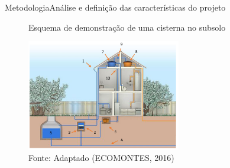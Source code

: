 \begin{frame}{Metodologia}{Análise e definição das características do projeto}

  \begin{figure}[H]
    \centering
    \caption{Esquema de demonstração de uma cisterna no subsolo}
    \includegraphics[width=0.6\textwidth]{figuras/esquema_cisterna.png}
    \caption*{\tiny{Fonte: Adaptado (ECOMONTES, 2016)}}
    \label{fig:esquema_cisterna}
  \end{figure}

\end{frame}

